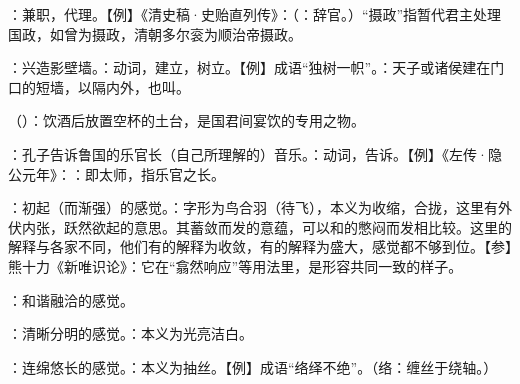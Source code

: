 {\item {}：兼职，代理。【例】《清史稿·史贻直列传》：（：辞官。）“摄政”指暂代君主处理国政，如曾为摄政，清朝多尔衮为顺治帝摄政。
\item {}：兴造影壁墙。：动词，建立，树立。【例】成语“独树一帜”。：天子或诸侯建在门口的短墙，以隔内外，也叫。
\item {}（）：饮酒后放置空杯的土台，是国君间宴饮的专用之物。
}
{}


{
\item {}：孔子告诉鲁国的乐官长（自己所理解的）音乐。：动词，告诉。【例】《左传·隐公元年》：：即太师，指乐官之长。
\item {}：初起（而渐强）的感觉。：字形为鸟合羽（待飞），本义为收缩，合拢，这里有外伏内张，跃然欲起的意思。其蓄敛而发的意蕴，可以和的憋闷而发相比较。这里的解释与各家不同，他们有的解释为收敛，有的解释为盛大，感觉都不够到位。【参】熊十力《新唯识论》：它在“翕然响应”等用法里，是形容共同一致的样子。
\item {}：和谐融洽的感觉。
\item {}：清晰分明的感觉。：本义为光亮洁白。
\item {}：连绵悠长的感觉。：本义为抽丝。【例】成语“络绎不绝”。（络：缠丝于绕轴。）
}
{}


